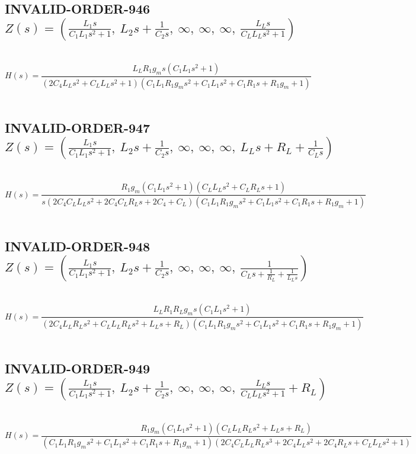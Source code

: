 \documentclass{article}
\begin{document}
\subsection{INVALID-ORDER-946 $Z(s) = \left( \frac{L_{1} s}{C_{1} L_{1} s^{2} + 1}, \  L_{2} s + \frac{1}{C_{2} s}, \  \infty, \  \infty, \  \infty, \  \frac{L_{L} s}{C_{L} L_{L} s^{2} + 1}\right)$ } \ 
\textbf{\[H(s) = \frac{L_{L} R_{1} g_{m} s \left(C_{1} L_{1} s^{2} + 1\right)}{\left(2 C_{4} L_{L} s^{2} + C_{L} L_{L} s^{2} + 1\right) \left(C_{1} L_{1} R_{1} g_{m} s^{2} + C_{1} L_{1} s^{2} + C_{1} R_{1} s + R_{1} g_{m} + 1\right)}\] } \ 
\subsection{INVALID-ORDER-947 $Z(s) = \left( \frac{L_{1} s}{C_{1} L_{1} s^{2} + 1}, \  L_{2} s + \frac{1}{C_{2} s}, \  \infty, \  \infty, \  \infty, \  L_{L} s + R_{L} + \frac{1}{C_{L} s}\right)$ } \ 
\textbf{\[H(s) = \frac{R_{1} g_{m} \left(C_{1} L_{1} s^{2} + 1\right) \left(C_{L} L_{L} s^{2} + C_{L} R_{L} s + 1\right)}{s \left(2 C_{4} C_{L} L_{L} s^{2} + 2 C_{4} C_{L} R_{L} s + 2 C_{4} + C_{L}\right) \left(C_{1} L_{1} R_{1} g_{m} s^{2} + C_{1} L_{1} s^{2} + C_{1} R_{1} s + R_{1} g_{m} + 1\right)}\] } \ 
\subsection{INVALID-ORDER-948 $Z(s) = \left( \frac{L_{1} s}{C_{1} L_{1} s^{2} + 1}, \  L_{2} s + \frac{1}{C_{2} s}, \  \infty, \  \infty, \  \infty, \  \frac{1}{C_{L} s + \frac{1}{R_{L}} + \frac{1}{L_{L} s}}\right)$ } \ 
\textbf{\[H(s) = \frac{L_{L} R_{1} R_{L} g_{m} s \left(C_{1} L_{1} s^{2} + 1\right)}{\left(2 C_{4} L_{L} R_{L} s^{2} + C_{L} L_{L} R_{L} s^{2} + L_{L} s + R_{L}\right) \left(C_{1} L_{1} R_{1} g_{m} s^{2} + C_{1} L_{1} s^{2} + C_{1} R_{1} s + R_{1} g_{m} + 1\right)}\] } \ 
\subsection{INVALID-ORDER-949 $Z(s) = \left( \frac{L_{1} s}{C_{1} L_{1} s^{2} + 1}, \  L_{2} s + \frac{1}{C_{2} s}, \  \infty, \  \infty, \  \infty, \  \frac{L_{L} s}{C_{L} L_{L} s^{2} + 1} + R_{L}\right)$ } \ 
\textbf{\[H(s) = \frac{R_{1} g_{m} \left(C_{1} L_{1} s^{2} + 1\right) \left(C_{L} L_{L} R_{L} s^{2} + L_{L} s + R_{L}\right)}{\left(C_{1} L_{1} R_{1} g_{m} s^{2} + C_{1} L_{1} s^{2} + C_{1} R_{1} s + R_{1} g_{m} + 1\right) \left(2 C_{4} C_{L} L_{L} R_{L} s^{3} + 2 C_{4} L_{L} s^{2} + 2 C_{4} R_{L} s + C_{L} L_{L} s^{2} + 1\right)}\] } \ 
\end{document}
